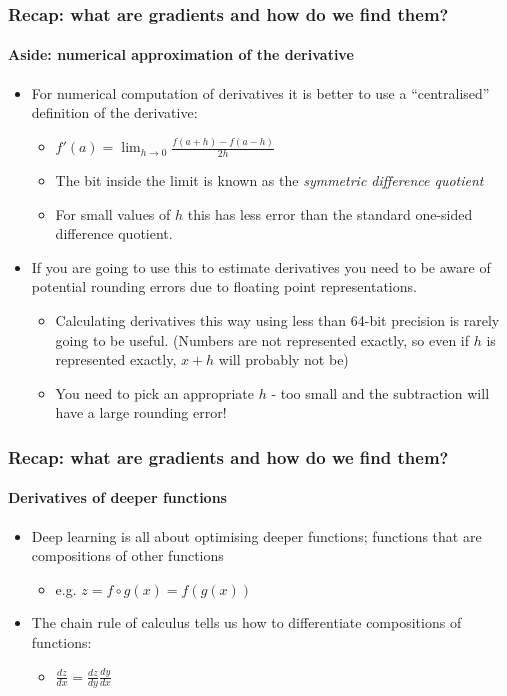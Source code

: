 \documentclass[\beamerclass]{beamer}
\begin{document}
\begin{frame}
\frametitle{Recap: what are gradients and how do we find them?}
\framesubtitle{Aside: numerical approximation of the derivative}

\begin{itemize}
\item For numerical computation of derivatives it is better to use a ``centralised'' definition of the derivative:
\begin{itemize}
	\item<+-> $f'(a) = \lim_{h\to0} \frac{f(a+h) - f(a-h)}{2h}$
	\item<+-> The bit inside the limit is known as the \emph{symmetric difference quotient}
	\item<+-> For small values of $h$ this has less error than the standard one-sided difference quotient.
\end{itemize}
\item<+-> If you are going to use this to estimate derivatives you need to be aware of potential rounding errors due to floating point representations.
\begin{itemize}
	\item Calculating derivatives this way using less than 64-bit precision is rarely going to be useful. (Numbers are not represented exactly, so even if $h$ is represented exactly, $x+h$ will probably not be)
	\item You need to pick an appropriate $h$ - too small and the subtraction will have a large rounding error!
\end{itemize}
\end{itemize}
\end{frame}

\begin{frame}
\frametitle{Recap: what are gradients and how do we find them?}
\framesubtitle{Derivatives of deeper functions}

\begin{itemize}
	\item<+-> Deep learning is all about optimising deeper functions; functions that are compositions of other functions
	\begin{itemize}
		\item e.g. $z = f \circ g(x) = f(g(x))$
	\end{itemize}
	\item<+-> The chain rule of calculus tells us how to differentiate compositions of functions:
	\begin{itemize}
		\item $\frac{dz}{dx}=\frac{dz}{dy}\frac{dy}{dx}$
	\end{itemize}
\end{itemize}
\end{frame}
\end{document}
